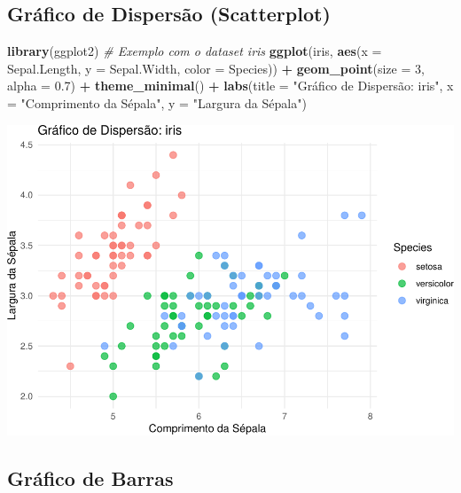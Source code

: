 \documentclass[
]{book}
\newenvironment{Shaded}{\begin{snugshade}}{\end{snugshade}}
\newcommand{\AttributeTok}[1]{\textcolor[rgb]{0.13,0.29,0.53}{#1}}
\newcommand{\CommentTok}[1]{\textcolor[rgb]{0.56,0.35,0.01}{\textit{#1}}}
\newcommand{\DecValTok}[1]{\textcolor[rgb]{0.00,0.00,0.81}{#1}}
\newcommand{\FloatTok}[1]{\textcolor[rgb]{0.00,0.00,0.81}{#1}}
\newcommand{\FunctionTok}[1]{\textcolor[rgb]{0.13,0.29,0.53}{\textbf{#1}}}
\newcommand{\NormalTok}[1]{#1}
\newcommand{\SpecialCharTok}[1]{\textcolor[rgb]{0.81,0.36,0.00}{\textbf{#1}}}
\newcommand{\StringTok}[1]{\textcolor[rgb]{0.31,0.60,0.02}{#1}}
\begin{document}
\subsection{Gráfico de Dispersão (Scatterplot)}\label{gruxe1fico-de-dispersuxe3o-scatterplot}

\begin{Shaded}
\begin{Highlighting}[]
\FunctionTok{library}\NormalTok{(ggplot2)}
\CommentTok{\# Exemplo com o dataset iris}
\FunctionTok{ggplot}\NormalTok{(iris, }\FunctionTok{aes}\NormalTok{(}\AttributeTok{x =}\NormalTok{ Sepal.Length, }\AttributeTok{y =}\NormalTok{ Sepal.Width, }\AttributeTok{color =}\NormalTok{ Species)) }\SpecialCharTok{+}
  \FunctionTok{geom\_point}\NormalTok{(}\AttributeTok{size =} \DecValTok{3}\NormalTok{, }\AttributeTok{alpha =} \FloatTok{0.7}\NormalTok{) }\SpecialCharTok{+}
  \FunctionTok{theme\_minimal}\NormalTok{() }\SpecialCharTok{+}
  \FunctionTok{labs}\NormalTok{(}\AttributeTok{title =} \StringTok{"Gráfico de Dispersão: iris"}\NormalTok{,}
       \AttributeTok{x =} \StringTok{"Comprimento da Sépala"}\NormalTok{,}
       \AttributeTok{y =} \StringTok{"Largura da Sépala"}\NormalTok{)}
\end{Highlighting}
\end{Shaded}

\includegraphics{LivroEstatisticaR_files/figure-latex/ggplotIris-1.pdf}

\subsection{Gráfico de Barras}\label{gruxe1fico-de-barras}
\end{document}

